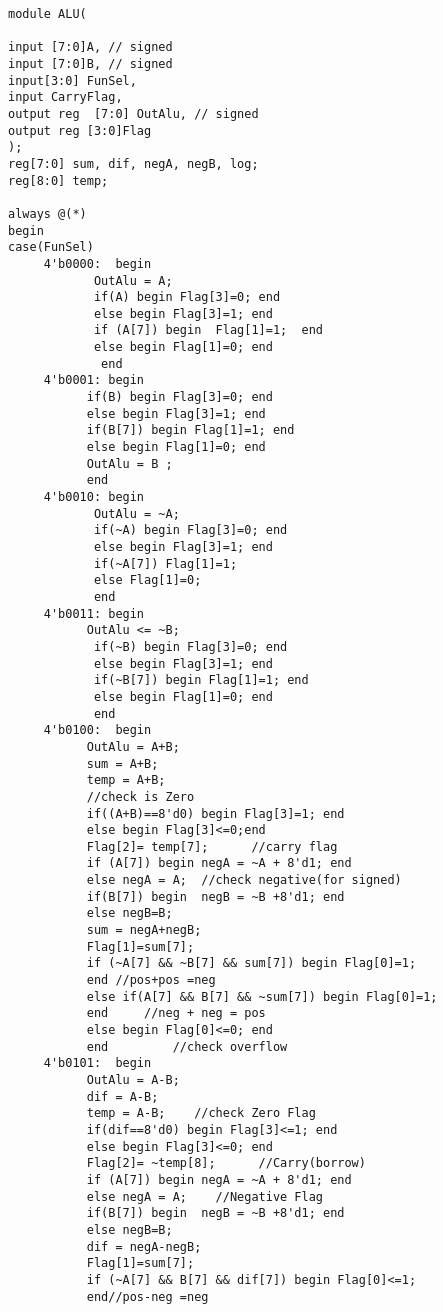 \documentclass[12pt]{article}
\begin{document}
\vspace{0.5cm}
\begin{lstlisting}
module ALU( 

input [7:0]A, // signed
input [7:0]B, // signed
input[3:0] FunSel,
input CarryFlag,
output reg  [7:0] OutAlu, // signed
output reg [3:0]Flag
);
reg[7:0] sum, dif, negA, negB, log;
reg[8:0] temp;

always @(*)
begin
case(FunSel)
     4'b0000:  begin 
            OutAlu = A; 
            if(A) begin Flag[3]=0; end
            else begin Flag[3]=1; end
            if (A[7]) begin  Flag[1]=1;  end
            else begin Flag[1]=0; end
             end
     4'b0001: begin
           if(B) begin Flag[3]=0; end
           else begin Flag[3]=1; end
           if(B[7]) begin Flag[1]=1; end
           else begin Flag[1]=0; end
           OutAlu = B ;
           end
     4'b0010: begin
            OutAlu = ~A;
            if(~A) begin Flag[3]=0; end
            else begin Flag[3]=1; end
            if(~A[7]) Flag[1]=1;
            else Flag[1]=0;
            end
     4'b0011: begin
           OutAlu <= ~B;
            if(~B) begin Flag[3]=0; end
            else begin Flag[3]=1; end
            if(~B[7]) begin Flag[1]=1; end
            else begin Flag[1]=0; end
            end
     4'b0100:  begin
           OutAlu = A+B;
           sum = A+B;
           temp = A+B;  
           //check is Zero
           if((A+B)==8'd0) begin Flag[3]=1; end
           else begin Flag[3]<=0;end   
           Flag[2]= temp[7];      //carry flag
           if (A[7]) begin negA = ~A + 8'd1; end
           else negA = A;  //check negative(for signed)
           if(B[7]) begin  negB = ~B +8'd1; end
           else negB=B;
           sum = negA+negB;
           Flag[1]=sum[7];   
           if (~A[7] && ~B[7] && sum[7]) begin Flag[0]=1;
           end //pos+pos =neg      
           else if(A[7] && B[7] && ~sum[7]) begin Flag[0]=1; 
           end     //neg + neg = pos
           else begin Flag[0]<=0; end
           end         //check overflow 
     4'b0101:  begin
           OutAlu = A-B;
           dif = A-B;
           temp = A-B;    //check Zero Flag
           if(dif==8'd0) begin Flag[3]<=1; end
           else begin Flag[3]<=0; end
           Flag[2]= ~temp[8];      //Carry(borrow)
           if (A[7]) begin negA = ~A + 8'd1; end
           else negA = A;    //Negative Flag
           if(B[7]) begin  negB = ~B +8'd1; end
           else negB=B;
           dif = negA-negB;
           Flag[1]=sum[7];
           if (~A[7] && B[7] && dif[7]) begin Flag[0]<=1; 
           end//pos-neg =neg

\end{lstlisting}
\end{document}
